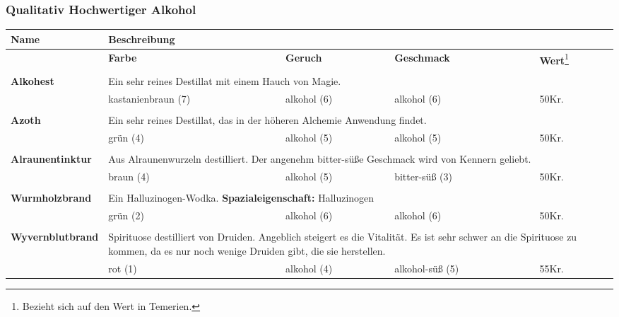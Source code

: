 \subsubsection{Qualitativ Hochwertiger Alkohol}

\begin{longtable}{|p{6cm}|p{}|p{}|p{}|p{1cm}|}
\hline
\textbf{Name} & \multicolumn{4}{p{10cm}|}{\textbf{Beschreibung}} \\ \hline
\multicolumn{1}{r|}{} & \textbf{Farbe} & \textbf{Geruch} & \textbf{Geschmack} & \textbf{Wert}\footnote{Bezieht sich auf den Wert in Temerien.} \\ \cline{2-5}
\multicolumn{5}{c}{} \\ \hline

\textbf{Alkohest} & \multicolumn{4}{p{10cm}|}{Ein sehr reines Destillat mit einem Hauch von Magie.} \\ \hline
\multicolumn{1}{r|}{} & kastanienbraun (7) & alkohol (6) & alkohol (6) & 50Kr. \\ \cline{2-5}

\multicolumn{5}{c}{} \\ \hline

\textbf{Azoth} & \multicolumn{4}{p{10cm}|}{Ein sehr reines Destillat, das in der höheren Alchemie Anwendung findet.} \\ \hline
\multicolumn{1}{r|}{} & grün (4) & alkohol (5) & alkohol (5) & 50Kr. \\ \cline{2-5}

\multicolumn{5}{c}{} \\ \hline

\textbf{Alraunentinktur} & \multicolumn{4}{p{10cm}|}{Aus Alraunenwurzeln destilliert. Der angenehm bitter-süße Geschmack wird von Kennern geliebt.} \\ \hline
\multicolumn{1}{r|}{} & braun (4) & alkohol (5) & bitter-süß (3) & 50Kr. \\ \cline{2-5}

\multicolumn{5}{c}{} \\ \hline

\textbf{Wurmholzbrand} & \multicolumn{4}{p{10cm}|}{Ein Halluzinogen-Wodka. \textbf{Spazialeigenschaft:} Halluzinogen} \\ \hline
\multicolumn{1}{r|}{} & grün (2) & alkohol (6) & alkohol (6) & 50Kr. \\ \cline{2-5}

\multicolumn{5}{c}{} \\ \hline

\textbf{Wyvernblutbrand} & \multicolumn{4}{p{10cm}|}{Spirituose destilliert von Druiden. Angeblich steigert es die Vitalität. Es ist sehr schwer an die Spirituose zu kommen, da es nur noch wenige Druiden gibt, die sie herstellen.} \\ \hline
\multicolumn{1}{r|}{} & rot (1) & alkohol (4) & alkohol-süß (5) & 55Kr. \\ \cline{2-5}


\end{longtable}
